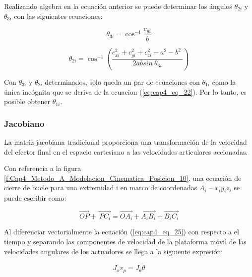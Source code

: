     Realizando algebra en la ecuación anterior se puede determinar los ángulos $\theta_{2i}$ y $\theta_{3i}$ con las siguientes ecuaciones: 
    
    \begin{equation}
       \theta _{3i}= \cos ^{-1}\frac{c_{yi}}{b} 
        \label{eq:cap4_eq_23}
    \end{equation}
     
    \begin{equation}
    \theta _{2i}=\cos ^{-1} \left( \frac{c_{xi}^{2}+c_{yi}^{2}+c_{zi}^{2}-a^{2}-b^{2}~}{2ab sin~ \theta _{3i}} \right) 
     \label{eq:cap4_eq_24}
    \end{equation}
    
    
    Con $\theta _{3i}$ y $\theta_{2i}$ determinados, solo queda un par de ecuaciones con $\theta_{1i}$ como la única incógnita que se deriva de la ecuacion (\ref{eq:cap4_eq_22}). Por lo tanto, es posible obtener  $\theta_{1i}$.

    
        \newpage

        \subsubsection{Jacobiano}\label{ma_jac}
        
        La matriz jacobiana tradicional proporciona una transformación de la velocidad del efector final en el espacio cartesiano a las velocidades articulares accionadas.

        Con referencia a la figura \ref{f:Cap4_Metodo_A_Modelacion_Cinematica_Posicion_10}, una ecuación de cierre de bucle para una extremidad i en marco de coordenadas  \( A_{i} \) – \( x_{i}y_{i}z_{i} \) se puede escribir como:
        
        \begin{equation}
             \overrightarrow{OP}+\overrightarrow{~PC_{i}} =\overrightarrow{OA_{i}}+\overrightarrow{A_{i}B_{i}}+\overrightarrow{B_{i}C_{i}}  
         \label{eq:cap4_eq_25}
        \end{equation}

        Al diferenciar vectorialmente la ecuación (\ref{eq:cap4_eq_25}) con respecto a el tiempo y separando las componentes de velocidad de la plataforma móvil de las velocidades angulares de los actuadores se llega a la siguiente expresión:
        
        \begin{equation}
            J_{x}v_{p}=J_{ \theta }\dot{ \theta } 
            \label{eq:cap4_eq_26}
        \end{equation}
        
